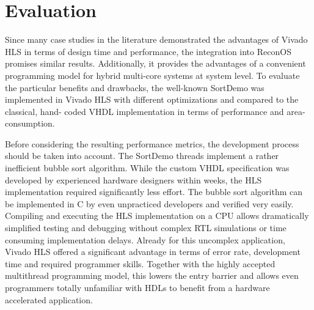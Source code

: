 \section{Evaluation}
Since many case studies in the literature demonstrated the advantages of
Vivado HLS in terms of design time and performance, the integration into
ReconOS promises similar results. Additionally, it provides the advantages of
a convenient programming model for hybrid multi-core systems at system level.
To evaluate the particular benefits and drawbacks, the well-known SortDemo was
implemented in Vivado HLS with different optimizations and compared to the
classical, hand- coded \ac{VHDL} implementation in terms of performance and
area-consumption.

Before considering the resulting performance metrics, the development process
should be taken into account. The SortDemo threads implement a rather
inefficient bubble sort algorithm. While the custom \ac{VHDL} specification
was developed by experienced hardware designers within weeks, the \ac{HLS}
implementation required significantly less effort. The bubble sort algorithm
can be implemented in C by even unpracticed developers and verified very
easily. Compiling and executing the \ac{HLS} implementation on a \ac{CPU}
allows dramatically simplified testing and debugging without complex \ac{RTL}
simulations or time consuming implementation delays. Already for this
uncomplex application, Vivado HLS offered a significant advantage in terms of
error rate, development time and required programmer skills. Together with the
highly accepted multithread programming model, this lowers the entry barrier
and allows even programmers totally unfamiliar with \acp{HDL} to benefit from
a hardware accelerated application.

